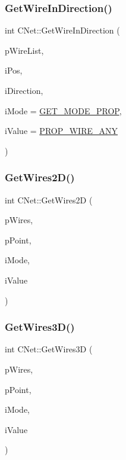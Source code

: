 \subsubsection{\texorpdfstring{GetWireInDirection()}{GetWireInDirection()}}
{\footnotesize\ttfamily int C\+Net\+::\+Get\+Wire\+In\+Direction (\begin{DoxyParamCaption}\item[{vector$<$ \mbox{\hyperlink{classCWire}{C\+Wire}} $\ast$ $>$ $\ast$}]{p\+Wire\+List,  }\item[{int}]{i\+Pos,  }\item[{int}]{i\+Direction,  }\item[{int}]{i\+Mode = {\ttfamily \mbox{\hyperlink{BoxRouter_8h_a678c4c2628bee05b15999bb00ded44d3}{G\+E\+T\+\_\+\+M\+O\+D\+E\+\_\+\+P\+R\+OP}}},  }\item[{int}]{i\+Value = {\ttfamily \mbox{\hyperlink{BoxRouter_8h_a3190814b5494277cd30ff3d03c8d4058}{P\+R\+O\+P\+\_\+\+W\+I\+R\+E\+\_\+\+A\+NY}}} }\end{DoxyParamCaption})}

\mbox{\label{classCNet_aa70dfc4170e25b64e56a85ef95691b86}} 
\subsubsection{\texorpdfstring{GetWires2D()}{GetWires2D()}}
{\footnotesize\ttfamily int C\+Net\+::\+Get\+Wires2D (\begin{DoxyParamCaption}\item[{vector$<$ \mbox{\hyperlink{classCWire}{C\+Wire}} $\ast$ $>$ $\ast$}]{p\+Wires,  }\item[{\mbox{\hyperlink{classCPoint}{C\+Point}} $\ast$}]{p\+Point,  }\item[{int}]{i\+Mode,  }\item[{int}]{i\+Value }\end{DoxyParamCaption})}

\mbox{\label{classCNet_a8c0924224990fa0de1c90a8d94c046e0}} 
\subsubsection{\texorpdfstring{GetWires3D()}{GetWires3D()}}
{\footnotesize\ttfamily int C\+Net\+::\+Get\+Wires3D (\begin{DoxyParamCaption}\item[{vector$<$ \mbox{\hyperlink{classCWire}{C\+Wire}} $\ast$ $>$ $\ast$}]{p\+Wires,  }\item[{\mbox{\hyperlink{classCPoint}{C\+Point}} $\ast$}]{p\+Point,  }\item[{int}]{i\+Mode,  }\item[{int}]{i\+Value }\end{DoxyParamCaption})}

